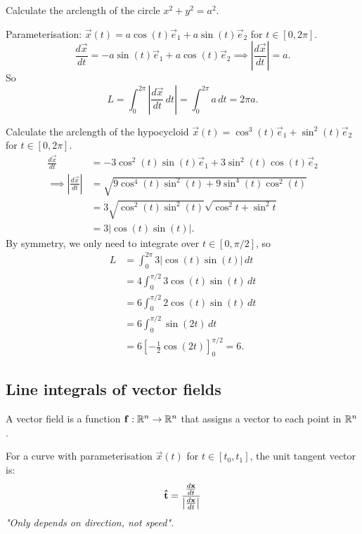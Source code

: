 \documentclass[10pt, a4paper]{article}
\begin{document}
\begin{example}
    Calculate the arclength of the circle $x ^ 2 + y ^ 2 = a ^ 2$.

    \begin{solution}
        Parameterisation:
        $\vec{x}(t) = a\cos(t)\vec{e}_1 + a\sin(t)\vec{e}_2$ for $t \in [0, 2\pi]$.
        \[
        \frac{d\vec{x}}{dt} = -a\sin(t)\vec{e}_1 + a\cos(t)\vec{e}_2 \implies \left|\frac{d\vec{x}}{dt}\right| = a.
        \]
        So
        \[
        L = \int_{0}^{2\pi}\left|\frac{d\vec{x}}{dt}\,dt\right| = \int_{0}^{2\pi}a\,dt = 2\pi a.
        \]
    \end{solution}
\end{example}

\begin{example}
    Calculate the arclength of the hypocycloid $\vec{x}(t) = \cos ^ 3(t)\vec{e}_1 + \sin ^ 2(t)\vec{e}_2$ for $t \in [0, 2\pi]$.
    \begin{align*}
        \frac{d\vec{x}}{dt} &= -3\cos ^ 2(t)\sin(t)\vec{e}_1 + 3\sin ^ 2(t)\cos(t)\vec{e}_2 \\
        \implies \left|\frac{d\vec{x}}{dt}\right| &= \sqrt{9\cos ^ 4(t)\sin ^ 2(t) + 9\sin ^ 4(t)\cos ^ 2(t)} \\
        &= 3\sqrt{\cos ^ 2(t)\sin ^ 2(t)}\sqrt{\cos ^ 2t + \sin ^ 2t} \\
        &= 3|\cos(t)\sin(t)|.
    \end{align*}
    By symmetry,
    we only need to integrate over $t \in [0, \pi / 2]$,
    so
    \begin{align*}
        L &= \int_{0}^{2\pi}3|\cos(t)\sin(t)|\,dt \\
        &= 4\int_{0}^{\pi / 2}3\cos(t)\sin(t)\,dt \\
        &= 6\int_{0}^{\pi / 2}2\cos(t)\sin(t)\,dt \\
        &= 6\int_{0}^{\pi / 2}\sin(2t)\,dt \\
        &= 6\left[-\frac{1}{2}\cos(2t)\right]_{0}^{\pi / 2} = 6.
    \end{align*}
\end{example}

\subsection{Line integrals of vector fields}
A vector field is a function $\mathbf{f} : \mathbb{R} ^ n \to \mathbb{R} ^ n$ that assigns a vector to each point in $\mathbb{R} ^ n$.

For a curve with parameterisation $\vec{x}(t)$ for $t \in [t_0, t_1]$,
the unit tangent vector is:
\[
\mathbf{\hat{t}} = \frac{\frac{d\mathbf{x}}{dt}}{\left|\frac{d\mathbf{x}}{dt}\right|}
\]
\textit{"Only depends on direction,
not speed".}
\end{document}
